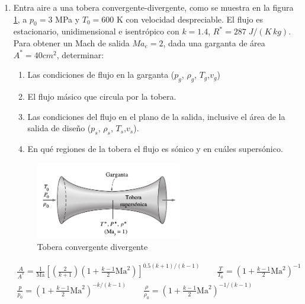 \documentclass[a4paper,10pt]{article}
\begin{document}
\begin{enumerate}
\item Entra aire a una tobera convergente-divergente, como se muestra en la figura \ref{fig:toberaConvDiv}, a $p_0 = 3$ MPa y $T_0 = 600$ K con velocidad despreciable. El flujo es estacionario, unidimensional e isentrópico con $k = 1.4$, $R^*= 287\;J/(K\,kg)$. Para obtener un Mach de salida $Ma_e = 2$, dada una garganta de área $A^* = 40 {cm}^2$, determinar:
\begin{enumerate}
\item Las condiciones de flujo en la garganta ($p_g$, $\rho_g$, $T_g$,$v_g$)
\item El flujo másico que circula por la tobera.
\item Las condiciones del flujo en el plano de la salida, inclusive el área de la salida de diseño ($p_s$, $\rho_s$, $T_s$,$v_s$).
\item En qué regiones de la tobera el flujo es sónico y en cuáles supersónico.
\end{enumerate}
\begin{figure}[h!!]
\centering
\includegraphics[width=0.6\textwidth]{toberaConvDiv.png}
\caption{Tobera convergente divergente}
\label{fig:toberaConvDiv}
\end{figure}

\begin{equation*}
\begin{aligned}
\frac{A}{A^*} = \frac{1}{\text{Ma}}\left[\left(\frac{2}{k+1}\right) \left(1 + \frac{k-1}{2}\text{Ma}^2\right)\right]^{0.5(k+1)/(k-1)}
\qquad
\frac{T}{T_0} = \left(1 + \frac{k-1}{2}\text{Ma}^2\right)^{-1}
\\
\frac{p}{p_0} = \left(1 + \frac{k-1}{2}\text{Ma}^2\right)^{-k/(k-1)}
\qquad
\frac{\rho}{\rho_0} = \left(1 + \frac{k-1}{2}\text{Ma}^2 \right)^{-1/(k-1)}
\end{aligned}
\end{equation*}
\end{enumerate}
\end{document}
